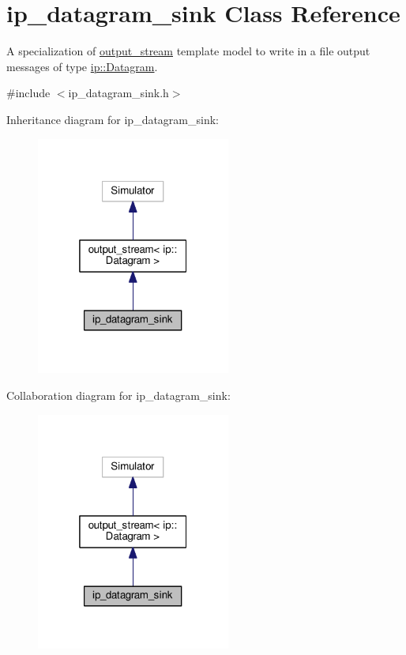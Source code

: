\hypertarget{classip__datagram__sink}{}\section{ip\+\_\+datagram\+\_\+sink Class Reference}
\label{classip__datagram__sink}


A specialization of \hyperlink{classoutput__stream}{output\+\_\+stream} template model to write in a file output messages of type \hyperlink{structip_1_1Datagram}{ip\+::\+Datagram}.  




{\ttfamily \#include $<$ip\+\_\+datagram\+\_\+sink.\+h$>$}



Inheritance diagram for ip\+\_\+datagram\+\_\+sink\+:\nopagebreak
\begin{figure}[H]
\begin{center}
\leavevmode
\includegraphics[width=181pt]{classip__datagram__sink__inherit__graph}
\end{center}
\end{figure}


Collaboration diagram for ip\+\_\+datagram\+\_\+sink\+:\nopagebreak
\begin{figure}[H]
\begin{center}
\leavevmode
\includegraphics[width=181pt]{classip__datagram__sink__coll__graph}
\end{center}
\end{figure}
